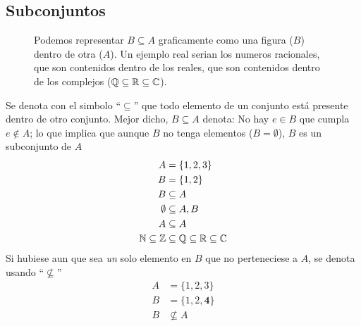 \documentclass[../teoria.root.tex]{subfiles}
\begin{document}
\subsection{Subconjuntos}

\begin{figure}
    \centering
    \caption{
        Podemos representar $B \subseteq A$ graficamente como una figura ($B$) dentro de otra ($A$).
        Un ejemplo real serian los numeros racionales,
        que son contenidos dentro de los reales, que son contenidos dentro de los complejos ($\mathbb{Q} \subseteq \mathbb{R} \subseteq \mathbb{C}$).
    }
\end{figure}

Se denota con el simbolo ``$\subseteq$'' que todo elemento de un conjunto está presente dentro de otro conjunto.
Mejor dicho, $B \subseteq A$ denota: No hay $e \in B$ que cumpla $e \notin A$; lo que implica que aunque $B$ no tenga
elementos ($B = \emptyset$), $B$ es un subconjunto de $A$
\begin{align*}
    A               & = \{ 1, 2, 3 \}                        \\
    B               & = \{ 1, 2 \}                           \\
    B               & \subseteq A                            \\
    \emptyset       & \subseteq A, B                         \\
    A               & \subseteq A                            \\
    \mathbb{N} \subseteq \mathbb{Z} & \subseteq \mathbb{Q} \subseteq \mathbb{R} \subseteq \mathbb{C} \\
\end{align*}
Si hubiese aun que sea \textit{un} solo elemento en $B$ que no perteneciese a $A$, se denota usando ``$\nsubseteq$''
\begin{align*}
    A & = \{ 1, 2, 3 \}          \\
    B & = \{ 1, 2, \textbf{4} \} \\
    B & \nsubseteq A
\end{align*}
\end{document}
